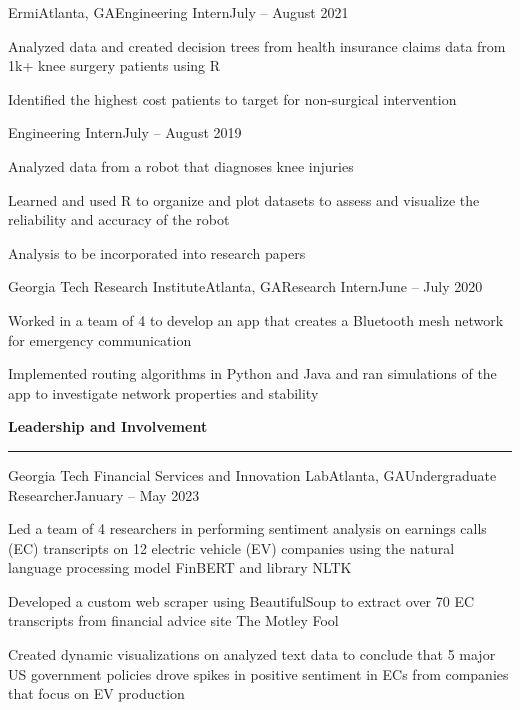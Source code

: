 \documentclass{article}
\newcommand{\horizontal}{\vspace{2pt}\hrule}
\newcommand{\sectitle}[1]{\vspace{2pt} \textbf{\large #1} \horizontal}
\begin{document}
\begin{flushleft}
    \begin{experience}{Ermi}{Atlanta, GA}{Engineering Intern}{July -- August 2021}
        \item Analyzed data and created decision trees from health insurance claims data from 1k+ knee surgery patients using R
        \item Identified the highest cost patients to target for non-surgical intervention
    \end{experience}
    \begin{subexperience}{Engineering Intern}{July -- August 2019}
        \item Analyzed data from a robot that diagnoses knee injuries
        \item Learned and used R to organize and plot datasets to assess and visualize the reliability and accuracy of the robot
        \item Analysis to be incorporated into research papers
    \end{subexperience}

    \begin{experience}{Georgia Tech Research Institute}{Atlanta, GA}{Research Intern}{June -- July 2020}
        \item Worked in a team of 4 to develop an app that creates a Bluetooth mesh network for emergency communication
        \item Implemented routing algorithms in Python and Java and ran simulations of the app to investigate network properties and stability
    \end{experience}


\sectitle{Leadership and Involvement}

    \begin{experience}{Georgia Tech Financial Services and Innovation Lab}{Atlanta, GA}{Undergraduate Researcher}{January -- May 2023}
        \item Led a team of 4 researchers in performing sentiment analysis on earnings calls (EC) transcripts on 12 electric vehicle (EV) companies using the natural language processing model FinBERT and library NLTK
        \item Developed a custom web scraper using BeautifulSoup to extract over 70 EC transcripts from financial advice site The Motley Fool
        \item Created dynamic visualizations on analyzed text data to conclude that 5 major US government policies drove spikes in positive sentiment in ECs from companies that focus on EV production
    \end{experience}


\end{flushleft}
\end{document}

